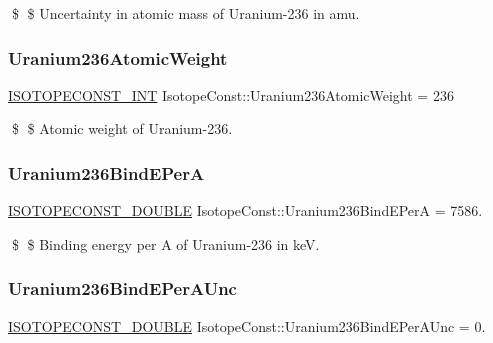 \$ \$ Uncertainty in atomic mass of Uranium-\/236 in amu. \mbox{\label{group___isotope_const-_uranium-_u236_ga2237ec5ecb9e1e91b9c9d52d532a367a}} 
\subsubsection{\texorpdfstring{Uranium236\+Atomic\+Weight}{Uranium236AtomicWeight}}
{\footnotesize\ttfamily \mbox{\hyperlink{group___isotope_const-_macros_ga5f18360b3e99483a35c32d789e62621c}{I\+S\+O\+T\+O\+P\+E\+C\+O\+N\+S\+T\+\_\+\+I\+NT}} Isotope\+Const\+::\+Uranium236\+Atomic\+Weight = 236}

\$ \$ Atomic weight of Uranium-\/236. \mbox{\label{group___isotope_const-_uranium-_u236_ga8ae3d7e5de1369a5aad584c0240bd8d6}} 
\subsubsection{\texorpdfstring{Uranium236\+Bind\+E\+PerA}{Uranium236BindEPerA}}
{\footnotesize\ttfamily \mbox{\hyperlink{group___isotope_const-_macros_ga8f45a7272ce02c0b4c65c44636ed719a}{I\+S\+O\+T\+O\+P\+E\+C\+O\+N\+S\+T\+\_\+\+D\+O\+U\+B\+LE}} Isotope\+Const\+::\+Uranium236\+Bind\+E\+PerA = 7586.}

\$ \$ Binding energy per A of Uranium-\/236 in keV. \mbox{\label{group___isotope_const-_uranium-_u236_gae074d4942842e2cf188b113591b68a7a}} 
\subsubsection{\texorpdfstring{Uranium236\+Bind\+E\+Per\+A\+Unc}{Uranium236BindEPerAUnc}}
{\footnotesize\ttfamily \mbox{\hyperlink{group___isotope_const-_macros_ga8f45a7272ce02c0b4c65c44636ed719a}{I\+S\+O\+T\+O\+P\+E\+C\+O\+N\+S\+T\+\_\+\+D\+O\+U\+B\+LE}} Isotope\+Const\+::\+Uranium236\+Bind\+E\+Per\+A\+Unc = 0.}

